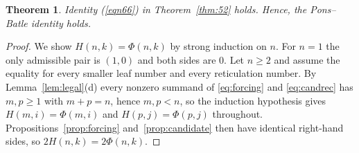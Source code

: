 \documentclass[11pt]{article}
\newtheorem{theorem}{Theorem}[section]
\theoremstyle{definition}
\theoremstyle{remark}
\begin{document}
\begin{theorem}
Identity (\ref{eqn66}) in Theorem~\ref{thm:52} holds. Hence, the
Pons--Batle identity holds.
\end{theorem}
\begin{proof}
We show $H(n,k)=\Phi(n,k)$ by strong induction on $n$. For $n=1$ the only admissible pair
is $(1,0)$ and both sides are $0$. Let $n\ge2$ and assume the equality for every smaller
leaf number and every reticulation number. By Lemma~\ref{lem:legal}(d) every nonzero
summand of \eqref{eq:forcing} and \eqref{eq:candrec} has $m,p\ge1$ with $m+p=n$, hence
$m,p<n$, so the induction hypothesis gives $H(m,i)=\Phi(m,i)$ and $H(p,j)=\Phi(p,j)$
throughout. Propositions~\ref{prop:forcing} and~\ref{prop:candidate} then have identical
right-hand sides, so $2H(n,k)=2\Phi(n,k)$.
\end{proof}





%
\end{document}
